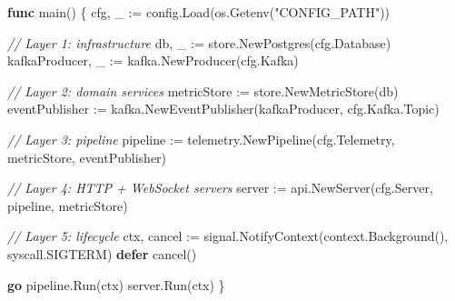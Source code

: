\documentclass[
]{article}
\newenvironment{Shaded}{}{}
\newcommand{\CommentTok}[1]{\textcolor[rgb]{0.38,0.63,0.69}{\textit{#1}}}
\newcommand{\ControlFlowTok}[1]{\textcolor[rgb]{0.00,0.44,0.13}{\textbf{#1}}}
\newcommand{\KeywordTok}[1]{\textcolor[rgb]{0.00,0.44,0.13}{\textbf{#1}}}
\newcommand{\NormalTok}[1]{#1}
\newcommand{\OperatorTok}[1]{\textcolor[rgb]{0.40,0.40,0.40}{#1}}
\newcommand{\StringTok}[1]{\textcolor[rgb]{0.25,0.44,0.63}{#1}}
\begin{document}
\begin{Shaded}
\begin{Highlighting}[]
\KeywordTok{func}\NormalTok{ main}\OperatorTok{()} \OperatorTok{\{}
\NormalTok{    cfg}\OperatorTok{,}\NormalTok{ \_ }\OperatorTok{:=}\NormalTok{ config}\OperatorTok{.}\NormalTok{Load}\OperatorTok{(}\NormalTok{os}\OperatorTok{.}\NormalTok{Getenv}\OperatorTok{(}\StringTok{"CONFIG\_PATH"}\OperatorTok{))}

    \CommentTok{// Layer 1: infrastructure}
\NormalTok{    db}\OperatorTok{,}\NormalTok{ \_ }\OperatorTok{:=}\NormalTok{ store}\OperatorTok{.}\NormalTok{NewPostgres}\OperatorTok{(}\NormalTok{cfg}\OperatorTok{.}\NormalTok{Database}\OperatorTok{)}
\NormalTok{    kafkaProducer}\OperatorTok{,}\NormalTok{ \_ }\OperatorTok{:=}\NormalTok{ kafka}\OperatorTok{.}\NormalTok{NewProducer}\OperatorTok{(}\NormalTok{cfg}\OperatorTok{.}\NormalTok{Kafka}\OperatorTok{)}

    \CommentTok{// Layer 2: domain services}
\NormalTok{    metricStore }\OperatorTok{:=}\NormalTok{ store}\OperatorTok{.}\NormalTok{NewMetricStore}\OperatorTok{(}\NormalTok{db}\OperatorTok{)}
\NormalTok{    eventPublisher }\OperatorTok{:=}\NormalTok{ kafka}\OperatorTok{.}\NormalTok{NewEventPublisher}\OperatorTok{(}\NormalTok{kafkaProducer}\OperatorTok{,}\NormalTok{ cfg}\OperatorTok{.}\NormalTok{Kafka}\OperatorTok{.}\NormalTok{Topic}\OperatorTok{)}

    \CommentTok{// Layer 3: pipeline}
\NormalTok{    pipeline }\OperatorTok{:=}\NormalTok{ telemetry}\OperatorTok{.}\NormalTok{NewPipeline}\OperatorTok{(}\NormalTok{cfg}\OperatorTok{.}\NormalTok{Telemetry}\OperatorTok{,}\NormalTok{ metricStore}\OperatorTok{,}\NormalTok{ eventPublisher}\OperatorTok{)}

    \CommentTok{// Layer 4: HTTP + WebSocket servers}
\NormalTok{    server }\OperatorTok{:=}\NormalTok{ api}\OperatorTok{.}\NormalTok{NewServer}\OperatorTok{(}\NormalTok{cfg}\OperatorTok{.}\NormalTok{Server}\OperatorTok{,}\NormalTok{ pipeline}\OperatorTok{,}\NormalTok{ metricStore}\OperatorTok{)}

    \CommentTok{// Layer 5: lifecycle}
\NormalTok{    ctx}\OperatorTok{,}\NormalTok{ cancel }\OperatorTok{:=}\NormalTok{ signal}\OperatorTok{.}\NormalTok{NotifyContext}\OperatorTok{(}\NormalTok{context}\OperatorTok{.}\NormalTok{Background}\OperatorTok{(),}\NormalTok{ syscall}\OperatorTok{.}\NormalTok{SIGTERM}\OperatorTok{)}
    \ControlFlowTok{defer}\NormalTok{ cancel}\OperatorTok{()}

    \ControlFlowTok{go}\NormalTok{ pipeline}\OperatorTok{.}\NormalTok{Run}\OperatorTok{(}\NormalTok{ctx}\OperatorTok{)}
\NormalTok{    server}\OperatorTok{.}\NormalTok{Run}\OperatorTok{(}\NormalTok{ctx}\OperatorTok{)}
\OperatorTok{\}}
\end{Highlighting}
\end{Shaded}
\end{document}
